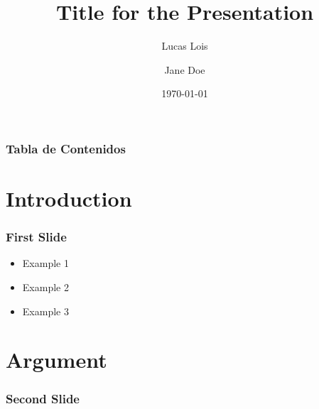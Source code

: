 \documentclass{beamer}
\title{Title for the Presentation}
\author[Lois]{
  Lucas Lois \and
  Jane Doe
}
\institute[UCUDAL]{Universidad Católica del Uruguay}
\date{\today}
\begin{document}
\frame{\titlepage}

\begin{frame}
\frametitle{Tabla de Contenidos}
\tableofcontents
\end{frame}

\section{Introduction}

\begin{frame}
  \frametitle{First Slide}

  \begin{itemize}
    \item<1> Example 1
    \item<2-> Example 2
    \item<3-> Example 3
  \end{itemize}
\end{frame}

\section{Argument}

\begin{frame}
  \frametitle{Second Slide}

  \blindtext
\end{frame}
\end{document}
